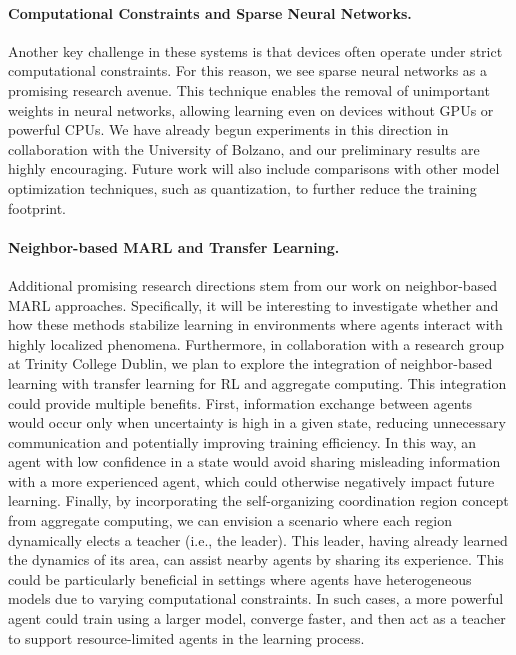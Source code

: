 \documentclass[12pt]{article}
\begin{document}
\paragraph{Computational Constraints and Sparse Neural Networks.}
Another key challenge in these systems is that devices often operate under strict computational constraints. 
%
For this reason, we see sparse neural networks as a promising research avenue. 
%
This technique enables the removal of unimportant weights in neural networks, allowing learning even on devices without 
 GPUs or powerful CPUs. 
% 
We have already begun experiments in this direction in collaboration with the University of Bolzano, 
 and our preliminary results are highly encouraging. 
% 
Future work will also include comparisons with other model optimization techniques, such as quantization, 
 to further reduce the training footprint.

\paragraph{Neighbor-based MARL and Transfer Learning.}
Additional promising research directions stem from our work on neighbor-based MARL approaches.
%
Specifically, it will be interesting to investigate whether and how these methods stabilize learning in environments 
 where agents interact with highly localized phenomena. 
% 
Furthermore, in collaboration with a research group at Trinity College Dublin, we plan to explore the integration of neighbor-based learning 
 with transfer learning for RL and aggregate computing.
%
This integration could provide multiple benefits. 
%
First, information exchange between agents would occur only when uncertainty is high in a given state, reducing unnecessary communication 
 and potentially improving training efficiency. 
% 
In this way, an agent with low confidence in a state would avoid sharing misleading information with a more experienced agent, 
 which could otherwise negatively impact future learning.
%
Finally, by incorporating the self-organizing coordination region concept from aggregate computing, we can envision a scenario where 
 each region dynamically elects a teacher (i.e., the leader).
% 
This leader, having already learned the dynamics of its area, can assist nearby agents by sharing its experience. 
%
This could be particularly beneficial in settings where agents have heterogeneous models due to varying computational constraints. 
%
In such cases, a more powerful agent could train using a larger model, converge faster, and then act as a teacher to support resource-limited 
 agents in the learning process.



\end{document}

